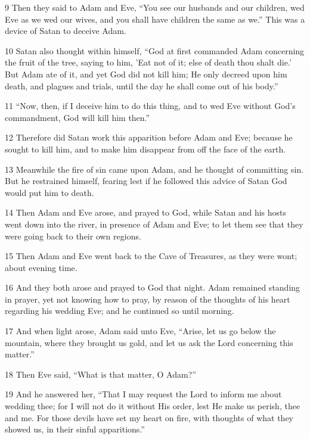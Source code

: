 \par 9 Then they said to Adam and Eve, “You see our husbands and our children, wed Eve as we wed our wives, and you shall have children the same as we.” This was a device of Satan to deceive Adam.

\par 10 Satan also thought within himself, “God at first commanded Adam concerning the fruit of the tree, saying to him, 'Eat not of it; else of death thou shalt die.' But Adam ate of it, and yet God did not kill him; He only decreed upon him death, and plagues and trials, until the day he shall come out of his body.”

\par 11 “Now, then, if I deceive him to do this thing, and to wed Eve without God's commandment, God will kill him then.”

\par 12 Therefore did Satan work this apparition before Adam and Eve; because he sought to kill him, and to make him disappear from off the face of the earth.

\par 13 Meanwhile the fire of sin came upon Adam, and he thought of committing sin. But he restrained himself, fearing lest if he followed this advice of Satan God would put him to death.

\par 14 Then Adam and Eve arose, and prayed to God, while Satan and his hosts went down into the river, in presence of Adam and Eve; to let them see that they were going back to their own regions.

\par 15 Then Adam and Eve went back to the Cave of Treasures, as they were wont; about evening time.

\par 16 And they both arose and prayed to God that night. Adam remained standing in prayer, yet not knowing how to pray, by reason of the thoughts of his heart regarding his wedding Eve; and he continued so until morning.

\par 17 And when light arose, Adam said unto Eve, “Arise, let us go below the mountain, where they brought us gold, and let us ask the Lord concerning this matter.”

\par 18 Then Eve said, “What is that matter, O Adam?”

\par 19 And he answered her, “That I may request the Lord to inform me about wedding thee; for I will not do it without His order, lest He make us perish, thee and me. For those devils have set my heart on fire, with thoughts of what they showed us, in their sinful apparitions.”


